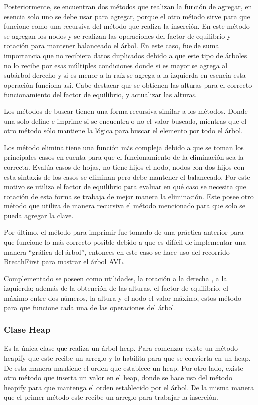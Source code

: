 \documentclass[12pt]{article}
\begin{document}
Posteriormente, se encuentran dos métodos que realizan la función de agregar, en esencia solo uno se debe usar para agregar, porque el otro método sirve para que funcione como una recursiva del método que realiza la inserción. En este método se agregan los nodos y se realizan las operaciones del factor de equilibrio y rotación para mantener balanceado el árbol. En este caso, fue de suma importancia que no recibiera datos duplicados debido a que este tipo de árboles no lo recibe por esas múltiples condiciones donde si es mayor se agrega al subárbol derecho y si es menor a la raíz se agrega a la izquierda en esencia esta operación funciona así. Cabe destacar que se obtienen las alturas para el correcto funcionamiento del  factor de equilibrio, y actualizar las alturas.

Los métodos de buscar tienen una forma recursiva similar a los métodos. Donde una solo define e imprime si se encuentra o no el valor buscado, mientras que el otro método sólo mantiene la lógica para buscar el elemento por todo el árbol.

Los método elimina tiene una función más compleja debido a que se toman los principales casos en cuenta para que el funcionamiento de la eliminación sea la correcta. Evalúa casos de hojas, no tiene hijos el nodo, nodos con dos hijos con esta sintaxis de los casos se eliminan pero debe mantener el balanceado. Por este motivo se utiliza el factor de equilibrio para evaluar en qué caso se necesita  que rotación de esta forma se trabaja de mejor manera la eliminación. Este posee otro método que utiliza de manera recursiva el método mencionado para que solo se pueda agregar la clave.

Por último, el método para imprimir fue tomado de una práctica anterior para que funcione lo más correcto posible debido a que es difícil de implementar  una manera “gráfica del árbol”, entonces en este caso se hace uso del recorrido BreathFirst para mostrar el árbol AVL.

Complementado se poseen como utilidades, la rotación a la derecha , a la izquierda; además de la obtención de las alturas, el factor de equilibrio, el máximo entre dos números, la altura y el nodo el valor máximo, estos método para que funcione cada una de las operaciones del árbol.
 
\subsubsection{Clase Heap}
Es la única clase que realiza un árbol heap. Para comenzar existe un método heapify que este recibe un arreglo y lo habilita para que se convierta en un heap. De esta manera mantiene el orden que establece un heap. Por otro lado, existe otro método que inserta un valor en el heap, donde se hace uso del método heapify para que mantenga el orden establecido por el árbol. De la misma manera que el primer método este recibe un arreglo para trabajar la inserción.
\end{document}
